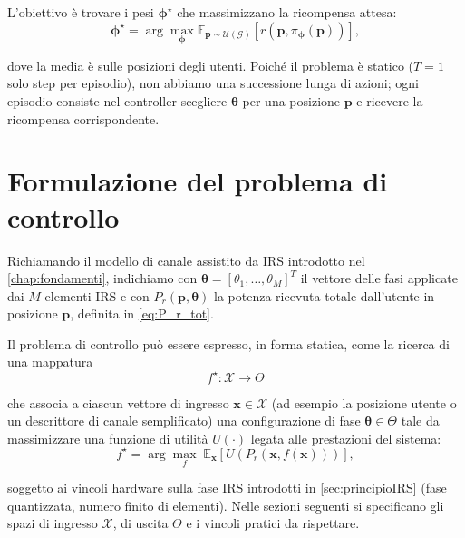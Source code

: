 \documentclass[12pt,a4paper]{report}
\begin{document}
L'obiettivo è trovare i pesi $\boldsymbol{\phi}^{\star}$ che
massimizzano la ricompensa attesa:
\begin{equation}
  \boldsymbol{\phi}^{\star} =
  \arg\max_{\boldsymbol{\phi}} \mathbb{E}_{\mathbf{p} \sim
  \mathcal{U}(\mathcal{G})} \left[ r(\mathbf{p},
  \pi_{\boldsymbol{\phi}}(\mathbf{p})) \right],
\end{equation}

dove la media è sulle posizioni degli utenti. Poiché il problema è
statico ($T=1$ solo step per episodio), non abbiamo una successione
lunga di azioni; ogni episodio consiste nel controller scegliere
$\boldsymbol{\theta}$ per una posizione $\mathbf{p}$ e ricevere la
ricompensa corrispondente.

\chapter{Formulazione del problema di controllo}
\label{chap:controlloIRS}

Richiamando il modello di canale assistito da IRS introdotto nel
\cref{chap:fondamenti}, indichiamo con $\boldsymbol{\theta} =
[\theta_1,\dots,\theta_M]^T$ il vettore delle fasi applicate dai $M$
elementi IRS e con $P_r(\mathbf{p}, \boldsymbol{\theta})$ la potenza
ricevuta totale dall'utente in posizione $\mathbf{p}$, definita in
\eqref{eq:P_r_tot}.

Il problema di controllo può essere espresso, in forma statica, come
la ricerca di una mappatura
\begin{equation}
  f^{\star} : \mathcal{X} \rightarrow \mathcal{\Theta}
\end{equation}

che associa a ciascun vettore di ingresso $\mathbf{x} \in
\mathcal{X}$ (ad esempio la posizione utente o un descrittore di
canale semplificato) una configurazione di fase $\boldsymbol{\theta}
\in \mathcal{\Theta}$ tale da massimizzare una funzione di utilità
$U(\cdot)$ legata alle prestazioni del sistema:
\begin{equation}
  f^{\star} = \arg\max_{f} \;
  \mathbb{E}_{\mathbf{x}}
  \left[ U\!\left(P_r(\mathbf{x}, f(\mathbf{x}))\right) \right],
  \label{eq:problema_controllo}
\end{equation}

soggetto ai vincoli hardware sulla fase IRS introdotti in
\cref{sec:principioIRS} (fase quantizzata, numero finito di
elementi). Nelle sezioni seguenti si specificano gli spazi di
ingresso $\mathcal{X}$, di uscita $\mathcal{\Theta}$ e i vincoli
pratici da rispettare.
\end{document}
